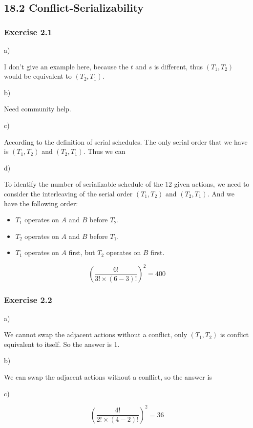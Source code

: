 \documentclass[../../main.tex]{subfiles}
\begin{document}
\subsection{18.2 Conflict-Serializability}

\subsubsection*{Exercise 2.1}

a)

I don't give an example here, because the $t$ and $s$ is different,
thus $(T_{1}, T_{2})$ would be equivalent to $(T_{2}, T_{1})$.

b)

Need community help.

c)

According to the definition of serial schedules. The only serial order
that we have is $(T_{1}, T_{2})$ and $(T_{2}, T_{1})$. Thus we can

d)

To identify the number of serializable schedule of the 12 given actions,
we need to consider the interleaving of the serial order $(T_{1}, T_{2})$
and $(T_{2}, T_{1})$. And we have the following order:

\begin{itemize}
  \item $T_{1}$ operates on $A$ and $B$ before $T_{2}$.
  \item $T_{2}$ operates on $A$ and $B$ before $T_{1}$.
  \item $T_{1}$ operates on $A$ first, but $T_{2}$ operates on $B$ first.
\end{itemize}


$$
\left(\frac{6!}{3! \times (6 - 3)!}\right)^{2} = 400
$$

\subsubsection*{Exercise 2.2}

a)

We cannot swap the adjacent actions without a conflict, only
$(T_{1}, T_{2})$ is conflict equivalent to itself. So the answer is 1.

b)

We can swap the adjacent actions without a conflict, so the answer is

c)

$$
\left(\frac{4!}{2! \times (4 - 2)!}\right)^{2} = 36
$$
\end{document}
